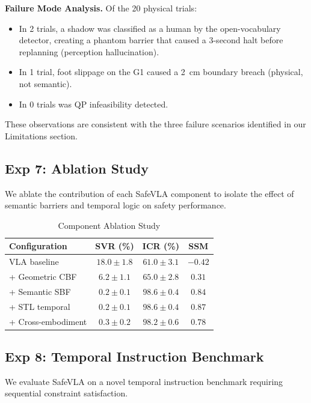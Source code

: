 \documentclass[conference]{IEEEtran}
\begin{document}
\noindent\textbf{Failure Mode Analysis.} Of the 20 physical trials:
\begin{itemize}
    \item In 2 trials, a shadow was classified as a human by the open-vocabulary detector, creating a phantom barrier that caused a 3-second halt before replanning (perception hallucination).
    \item In 1 trial, foot slippage on the G1 caused a 2~cm boundary breach (physical, not semantic).
    \item In 0 trials was QP infeasibility detected.
\end{itemize}
These observations are consistent with the three failure scenarios identified in our Limitations section.

\subsection{Exp 7: Ablation Study}
We ablate the contribution of each SafeVLA component to isolate the effect of semantic barriers and temporal logic on safety performance.

\begin{table}[h]
\centering
\caption{Component Ablation Study}
\begin{tabular}{lccc}
\toprule
\textbf{Configuration} & \textbf{SVR (\%)} & \textbf{ICR (\%)} & \textbf{SSM} \\
\midrule
VLA baseline & $18.0 \pm 1.8$ & $61.0 \pm 3.1$ & $-0.42$ \\
+ Geometric CBF & $6.2 \pm 1.1$ & $65.0 \pm 2.8$ & $0.31$ \\
+ Semantic SBF & $0.2 \pm 0.1$ & $98.6 \pm 0.4$ & $0.84$ \\
+ STL temporal & $0.2 \pm 0.1$ & $98.6 \pm 0.4$ & $0.87$ \\
+ Cross-embodiment & $0.3 \pm 0.2$ & $98.2 \pm 0.6$ & $0.78$ \\
\bottomrule
\end{tabular}
\end{table}

\subsection{Exp 8: Temporal Instruction Benchmark}
We evaluate SafeVLA on a novel temporal instruction benchmark requiring sequential constraint satisfaction.
\end{document}
